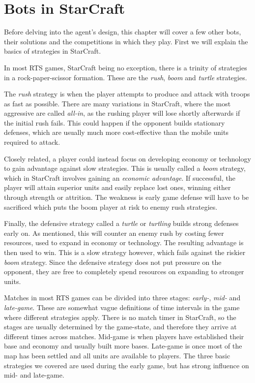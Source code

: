 \chapter{Bots in StarCraft}
Before delving into the agent's design, this chapter will cover a few other bots, their solutions and the competitions in which they play. First we will explain the basics of strategies in StarCraft.

In most RTS games, StarCraft being no exception, there is a trinity of strategies in a rock-paper-scissor formation. These are the \emph{rush}, \emph{boom} and \emph{turtle} strategies.

The \emph{rush} strategy is when the player attempts to produce and attack with troops as fast as possible. There are many variations in StarCraft, where the most aggressive are called \emph{all-in}, as the rushing player will lose shortly afterwards if the initial rush fails. This could happen if the opponent builds stationary defenses, which are usually much more cost-effective than the mobile units required to attack.

Closely related, a player could instead focus on developing economy or technology to gain advantage against slow strategies. This is usually called a \emph{boom} strategy, which in StarCraft involves gaining an \emph{economic advantage}. If successful, the player will attain superior units and easily replace lost ones, winning either through strength or attrition. The weakness is early game defense will have to be sacrificed which puts the boom player at risk to enemy rush strategies.

Finally, the defensive strategy called a \emph{turtle} or \emph{turtling} builds strong defenses early on. As mentioned, this will counter an enemy rush by costing fewer resources, used to expand in economy or technology. The resulting advantage is then used to win. This is a slow strategy however, which fails against the riskier \emph{boom} strategy. Since the defensive strategy does not put pressure on the opponent, they are free to completely spend resources on expanding to stronger units.

Matches in most RTS games can be divided into three stages: \emph{early-}, \emph{mid-} and \emph{late-game}. These are somewhat vague definitions of time intervals in the game where different strategies apply. There is no match timer in StarCraft, so the stages are usually determined by the game-state, and therefore they arrive at different times across matches. Mid-game is when players have established their base and economy and usually built more bases. Late-game is once most of the map has been settled and all units are available to players. The three basic strategies we covered are used during the early game, but has strong influence on mid- and late-game.

